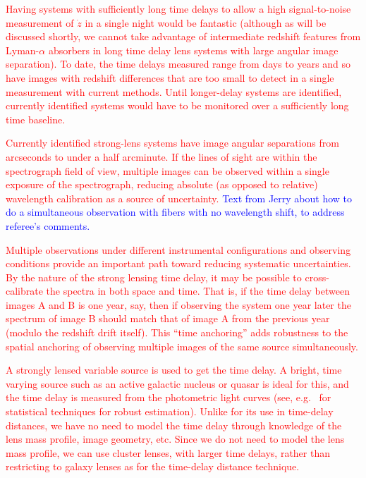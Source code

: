 \documentclass[preprint2, 10pt]{aastex}
\begin{document}
\textcolor{red}{
Having systems with sufficiently long time delays to allow a
high signal-to-noise measurement of $\dot{z}$ in a single night would
be fantastic (although as will be discussed shortly, we cannot take advantage of intermediate redshift features from 
Lyman-$\alpha$ absorbers in long time delay lens systems with large angular image separation).
To date, the time delays measured range from days to
years \citep{2007ApJ...662...62F,2008ApJ...676..761F, 2013ApJ...764..186F}
and so have images with redshift
differences that are too small to detect in a single measurement with current methods.
Until longer-delay systems are identified, currently identified systems would
have to be monitored over a sufficiently long time baseline.}



\textcolor{red}{
Currently identified strong-lens systems have image angular separations from arcseconds
to under a half arcminute.
If the lines of sight are within the spectrograph field of view, 
multiple images can be observed within
a single exposure of the spectrograph, reducing
absolute (as opposed to relative) wavelength calibration as a source
of uncertainty.} 
\textcolor{blue}{Text from Jerry about how to do a simultaneous observation with fibers with
no wavelength shift, to address referee's comments.} 


\textcolor{red}{Multiple observations under different instrumental configurations
and observing conditions provide an important path toward reducing systematic
uncertainties. By the nature of the strong lensing time delay, it may be possible 
to cross-calibrate the spectra in both space and time.  That is, if the time 
delay between images A and B is one year, say, then if observing the system 
one year later the spectrum of image B should match that of image A from 
the previous year (modulo the redshift drift itself).  This ``time anchoring'' adds robustness to 
the spatial anchoring of observing multiple images of the same source 
simultaneously. 
}


\textcolor{red}{
A strongly lensed variable source is used to get the time delay. A bright, time varying source 
such as an active galactic nucleus or quasar is ideal for this, and the time delay is measured from 
the photometric light curves (see, e.g.\ \citet{tewes,hkl} for statistical 
techniques for robust estimation).
Unlike for its use in time-delay distances, 
we have no need to model the time delay through knowledge of the lens mass 
profile, image geometry, etc.
Since we do not need to model the lens mass profile, we can 
use cluster lenses, with larger time delays, rather than restricting to 
galaxy lenses as for the time-delay distance technique. }
\end{document}
